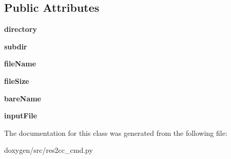 \subsection*{Public Attributes}
\begin{DoxyCompactItemize}
\item 
\mbox{\label{classres2cc__cmd_1_1_file_ac4d2f8723afe8f54e99abc605b1f0cc6}} 
{\bfseries directory}
\item 
\mbox{\label{classres2cc__cmd_1_1_file_ae6919ea0849ff51ff2679de78b50f44c}} 
{\bfseries subdir}
\item 
\mbox{\label{classres2cc__cmd_1_1_file_ae2daaffd697b334701ec4a53d6c5e86d}} 
{\bfseries file\+Name}
\item 
\mbox{\label{classres2cc__cmd_1_1_file_ad8db4b9b56241aaeb9a03ace54ba2d52}} 
{\bfseries file\+Size}
\item 
\mbox{\label{classres2cc__cmd_1_1_file_ad0350931d4e89c8940282f84512b2016}} 
{\bfseries bare\+Name}
\item 
\mbox{\label{classres2cc__cmd_1_1_file_a03df7c3cbcb26806078400c89aaedc22}} 
{\bfseries input\+File}
\end{DoxyCompactItemize}


The documentation for this class was generated from the following file\+:\begin{DoxyCompactItemize}
\item 
doxygen/src/res2cc\+\_\+cmd.\+py\end{DoxyCompactItemize}
